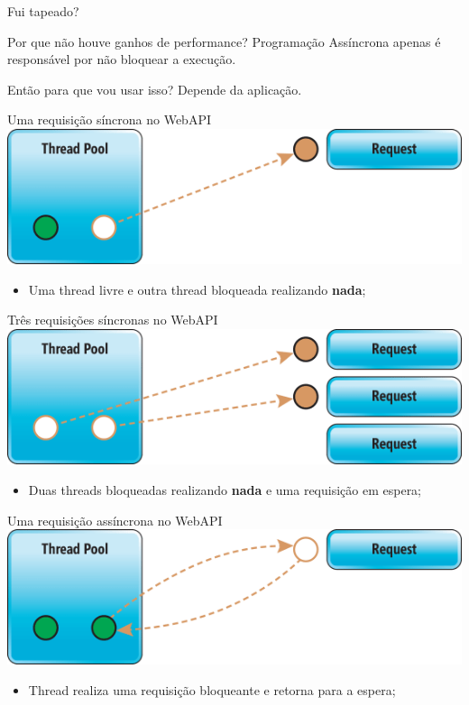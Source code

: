 \documentclass[10pt]{beamer}
\begin{document}
\begin{frame}{Fui tapeado?}
	\begin{alertblock}{Por que não houve ganhos de performance?}
		Programação Assíncrona apenas é responsável por não bloquear a execução.
	\end{alertblock}
	\vspace{0.2cm}
	\begin{exampleblock}{Então para que vou usar isso?}
		Depende da aplicação.
	\end{exampleblock}
\end{frame}

\begin{frame}{Uma requisição síncrona no WebAPI}
	\includegraphics[width=\textwidth]{imgs/sync1}
	\begin{itemize}
		\item Uma thread livre e outra thread bloqueada realizando \textbf{nada};
	\end{itemize}
\end{frame}

\begin{frame}{Três requisições síncronas no WebAPI}
	\includegraphics[width=\textwidth]{imgs/sync2}
	\begin{itemize}
		\item Duas threads bloqueadas realizando \textbf{nada} e uma requisição em espera;
	\end{itemize}
\end{frame}

\begin{frame}{Uma requisição assíncrona no WebAPI}
	\includegraphics[width=\textwidth]{imgs/async}
	\begin{itemize}
		\item Thread realiza uma requisição bloqueante e retorna para a espera;
	\end{itemize}
\end{frame}
\end{document}
